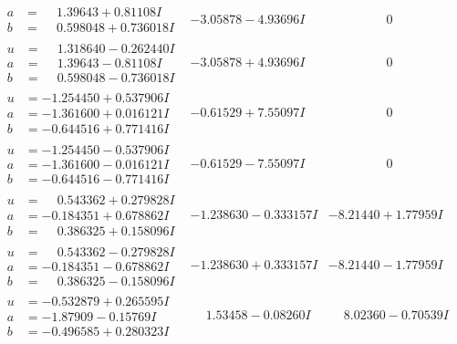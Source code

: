 \documentclass[1p]{elsarticle_modified}
\theoremstyle{definition}
\begin{document}
$$\begin{array}{c|c|c}
\begin{aligned}
a &= \phantom{-}1.39643 + 0.81108 I \\
b &= \phantom{-}0.598048 + 0.736018 I\end{aligned}
 & -3.05878 - 4.93696 I & \phantom{-0.000000 } 0 \\ \hline\begin{aligned}
u &= \phantom{-}1.318640 - 0.262440 I \\
a &= \phantom{-}1.39643 - 0.81108 I \\
b &= \phantom{-}0.598048 - 0.736018 I\end{aligned}
 & -3.05878 + 4.93696 I & \phantom{-0.000000 } 0 \\ \hline\begin{aligned}
u &= -1.254450 + 0.537906 I \\
a &= -1.361600 + 0.016121 I \\
b &= -0.644516 + 0.771416 I\end{aligned}
 & -0.61529 + 7.55097 I & \phantom{-0.000000 } 0 \\ \hline\begin{aligned}
u &= -1.254450 - 0.537906 I \\
a &= -1.361600 - 0.016121 I \\
b &= -0.644516 - 0.771416 I\end{aligned}
 & -0.61529 - 7.55097 I & \phantom{-0.000000 } 0 \\ \hline\begin{aligned}
u &= \phantom{-}0.543362 + 0.279828 I \\
a &= -0.184351 + 0.678862 I \\
b &= \phantom{-}0.386325 + 0.158096 I\end{aligned}
 & -1.238630 - 0.333157 I & -8.21440 + 1.77959 I \\ \hline\begin{aligned}
u &= \phantom{-}0.543362 - 0.279828 I \\
a &= -0.184351 - 0.678862 I \\
b &= \phantom{-}0.386325 - 0.158096 I\end{aligned}
 & -1.238630 + 0.333157 I & -8.21440 - 1.77959 I \\ \hline\begin{aligned}
u &= -0.532879 + 0.265595 I \\
a &= -1.87909 - 0.15769 I \\
b &= -0.496585 + 0.280323 I\end{aligned}
 & \phantom{-}1.53458 - 0.08260 I & \phantom{-}8.02360 - 0.70539 I \\ \hline\begin{aligned}

\end{aligned}
\end{array}$$
\end{document}
